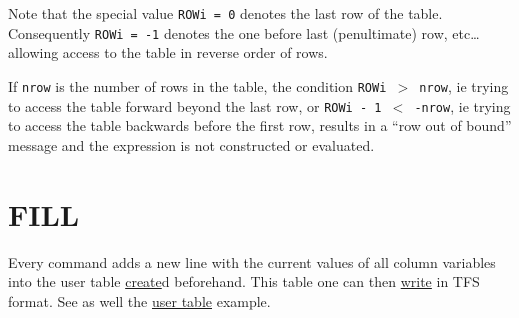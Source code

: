 Note that the special value \texttt{ROWi~=~0} denotes the last row of
the table. \\
Consequently \texttt{ROWi~=~-1} denotes the one before last
(penultimate) row, etc\ldots allowing access to the table in reverse
order of rows. 

If \texttt{nrow} is the number of rows in the table, the condition
\texttt{ROWi $>$ nrow}, ie trying to access the table forward beyond the
last row, or \texttt{ROWi - 1 $<$ -nrow}, ie trying to access the table
backwards before the first row, results in a ``row out of bound''
message and the expression is not constructed or evaluated. 


\section{FILL} 
\label{sec:fill}
Every command 
adds a new line with the current values of all column variables into the
user table \hyperlink{create}{create}d beforehand. This table one can
then \hyperlink{write}{write} in TFS format.  See as well the
\href{../Introduction/select.html#ucreate}{user table} example.  






